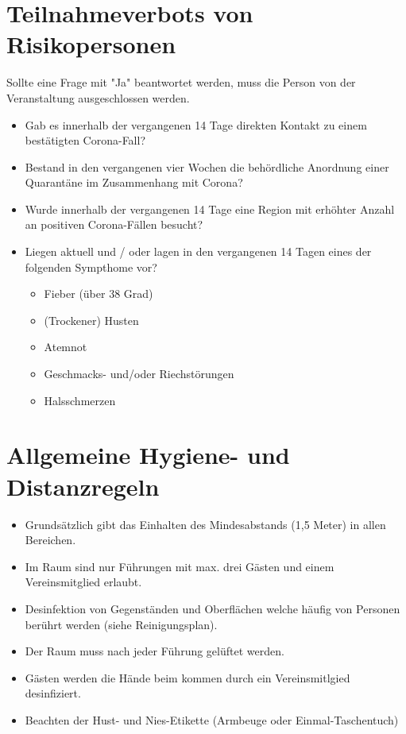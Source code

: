 \documentclass[10pt,a4paper]{scrartcl}
\begin{document}
\section{Teilnahmeverbots von Risikopersonen}
Sollte eine Frage mit "Ja" beantwortet werden, muss die Person von der Veranstaltung ausgeschlossen werden.
\begin{itemize}
  \item Gab es innerhalb der vergangenen 14 Tage direkten Kontakt zu einem bestätigten Corona-Fall?
  \item Bestand in den vergangenen vier Wochen die behördliche Anordnung einer Quarantäne im Zusammenhang mit Corona?
  \item Wurde innerhalb der vergangenen 14 Tage eine Region mit erhöhter Anzahl an positiven Corona-Fällen besucht?
  \item Liegen aktuell und / oder lagen in den vergangenen 14 Tagen eines der folgenden Sympthome vor?
  \begin{itemize}
    \item Fieber (über 38 Grad)
    \item (Trockener) Husten
    \item Atemnot
    \item Geschmacks- und/oder Riechstörungen
    \item Halsschmerzen
  \end{itemize}
\end{itemize}


\section{Allgemeine Hygiene- und Distanzregeln}
\begin{itemize}
\item Grundsätzlich gibt das Einhalten des Mindesabstands (1,5 Meter) in allen Bereichen.
\item Im Raum sind nur Führungen mit max. drei Gästen und einem Vereinsmitglied erlaubt.
\item Desinfektion von Gegenständen und Oberflächen welche häufig von Personen berührt werden (siehe Reinigungsplan).
\item Der Raum muss nach jeder Führung gelüftet werden.
\item Gästen werden die Hände beim kommen durch ein Vereinsmitlgied desinfiziert.
\item Beachten der Hust- und Nies-Etikette (Armbeuge oder Einmal-Taschentuch)
\end{itemize}
\end{document}
